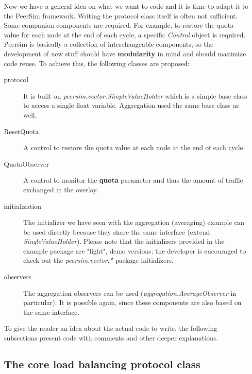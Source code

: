 \documentclass[a4paper,11pt]{article}
\begin{document}
Now we have a general idea on what we want to code and it is time to
adapt it to the PeerSim framework. Writing the protocol class itself
is often not sufficient. Some companion components are required.
For example, to restore the quota value for each node at the end of
each cycle, a specific \emph{Control} object is required. Peersim
is basically a collection of interchangeable components, so the development
of new stuff should have \textbf{modularity} in mind and should maximize
code reuse. To achieve this, the following classes are proposed:

\begin{description}
\item[protocol]  It is built on
  \emph{peersim.vector.SimpleValueHolder} which is a simple base class
  to access a single float variable. Aggregation used the same base class
  as well.

\item[ResetQuota] A control to restore the quota value
  at each node at the end of each cycle.

\item[QuotaObserver] A control to monitor the \textbf{quota}
  parameter and thus the amount of traffic exchanged in the overlay. 

\item[initialization]
 The initializer we have seen with the aggregation (averaging) example can
 be used directly because they
 share the same interface (extend \emph{SingleValueHolder}).
Please note that the initializers provided in the example package are
"light", demo versions; the developer is encouraged to check out the
\emph{peersim.vector.*} package initializers.

\item[observers] The aggregation observers can be
  used (\emph{aggregation.AverageObserver} in particular). It is possible
  again, since these components are also based on the same interface.
\end{description}

To give the reader an idea about the actual code to write, the following
subsections present code with comments and other deeper explanations.

\subsection{The core load balancing protocol class}
\end{document}
